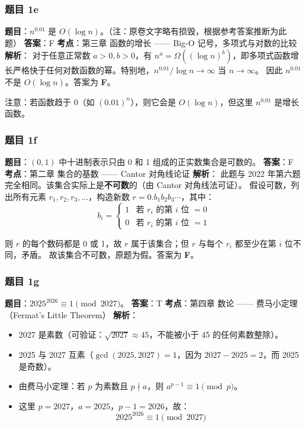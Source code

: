 \documentclass[10pt,a4paper,openany]{ctexbook}
\theoremstyle{definition}
\theoremstyle{remark}
\renewenvironment{quote}
  {\list{}{\leftmargin=1em\rightmargin=0pt\topsep=0.5pt\partopsep=0pt}\item[]}
  {\endlist}
\begin{document}
\subsubsection{题目 1e}

\textbf{题目}：$n^{0.01}$ 是 $O(\log n)$。（注：原卷文字略有损毁，根据参考答案推断为此题）
\textbf{答案}：F
\textbf{考点}：第三章 函数的增长 —— Big-O 记号，多项式与对数的比较
\textbf{解析}：
对于任意正常数 $a > 0, b > 0$，有 $n^a = \Omega((\log n)^b)$，即多项式函数增长严格快于任何对数函数的幂。特别地，$n^{0.01} / \log n \to \infty$ 当 $n \to \infty$。
因此 $n^{0.01}$ 不是 $O(\log n)$。答案为 \textbf{F}。
\begin{quote}
注意：若函数趋于 0（如 $(0.01)^n$），则它会是 $O(\log n)$，但这里 $n^{0.01}$ 是增长函数。

\end{quote}
\vspace{-2pt}

\subsubsection{题目 1f}

\textbf{题目}：$(0,1)$ 中十进制表示只由 0 和 1 组成的正实数集合是可数的。
\textbf{答案}：F
\textbf{考点}：第二章 集合的基数 —— Cantor 对角线论证
\textbf{解析}：
此题与 2022 年第六题完全相同。该集合实际上是\textbf{不可数}的（由 Cantor 对角线法可证）。
假设可数，列出所有元素 $r_1, r_2, r_3, \ldots$，构造新数 $r = 0.b_1b_2b_3\cdots$，其中：
\[
b_i = \begin{cases}
1 & \text{若 } r_i\text{ 的第 }i\text{ 位 } = 0 \\
0 & \text{若 } r_i\text{ 的第 }i\text{ 位 } = 1
\end{cases}
\]

则 $r$ 的每个数码都是 0 或 1，故 $r$ 属于该集合；但 $r$ 与每个 $r_i$ 都至少在第 $i$ 位不同，矛盾。
故该集合不可数，原题为假。答案为 \textbf{F}。
\vspace{-2pt}

\subsubsection{题目 1g}

\textbf{题目}：$2025^{2026} \equiv 1 \pmod{2027}$。
\textbf{答案}：T
\textbf{考点}：第四章 数论 —— 费马小定理（Fermat's Little Theorem）
\textbf{解析}：
\begin{itemize}
\item 2027 是素数（可验证：$\sqrt{2027} \approx 45$，不能被小于 45 的任何素数整除）。
\item 2025 与 2027 互素（$\gcd(2025, 2027) = 1$，因为 $2027 - 2025 = 2$，而 2025 是奇数）。
\item 由费马小定理：若 $p$ 为素数且 $p \nmid a$，则 $a^{p-1} \equiv 1 \pmod{p}$。
\item 这里 $p = 2027$，$a = 2025$，$p-1 = 2026$，故：
\[
2025^{2026} \equiv 1 \pmod{2027}
\]

\end{itemize}
\end{document}
